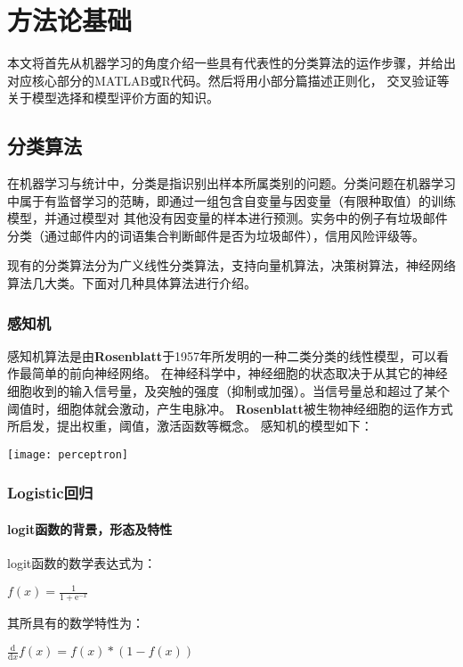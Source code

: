 \chapter{方法论基础}
本文将首先从机器学习的角度介绍一些具有代表性的分类算法的运作步骤，并给出对应核心部分的MATLAB或R代码。然后将用小部分篇描述正则化，
交叉验证等关于模型选择和模型评价方面的知识。


\section{分类算法}

在机器学习与统计中，分类是指识别出样本所属类别的问题。分类问题在机器学习中属于有监督学习的范畴，即通过一组包含自变量与因变量（有限种取值）的训练模型，并通过模型对
其他没有因变量的样本进行预测。实务中的例子有垃圾邮件分类（通过邮件内的词语集合判断邮件是否为垃圾邮件），信用风险评级等。

现有的分类算法分为广义线性分类算法，支持向量机算法，决策树算法，神经网络算法几大类。下面对几种具体算法进行介绍。

\subsection{感知机}

感知机算法是由\textbf{Rosenblatt}于1957年所发明的一种二类分类的线性模型，可以看作最简单的前向神经网络。
在神经科学中，神经细胞的状态取决于从其它的神经细胞收到的输入信号量，及突触的强度（抑制或加强）。当信号量总和超过了某个阈值时，细胞体就会激动，产生电脉冲。
\textbf{Rosenblatt}被生物神经细胞的运作方式所启发，提出权重，阈值，激活函数等概念。
感知机的模型如下：


\texttt{[image: perceptron]}




\subsection{Logistic回归}



\subsubsection{logit函数的背景，形态及特性}

logit函数的数学表达式为：

$f(x) = \frac{1}{1+\mathrm{e}^{-x}}$

其所具有的数学特性为：

$\frac{\mathrm d}{\mathrm d x} f(x) = f(x) * (1-f(x))$



